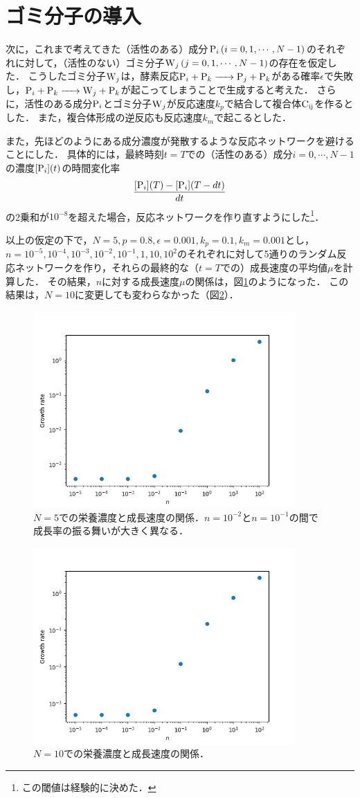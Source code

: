 \documentclass[a4paper,11pt]{jsarticle}
\begin{document}
\section{ゴミ分子の導入}
次に，これまで考えてきた（活性のある）成分$\ce{P_i}\,(i=0,1,\cdots,N-1)$のそれぞれに対して，（活性のない）ゴミ分子$\ce{W_j}\,(j=0,1,\cdots,N-1)$の存在を仮定した．
こうしたゴミ分子$\ce{W_j}$は，酵素反応$\ce{P_i + P_k -> P_j + P_k}$がある確率$\epsilon$で失敗し，$\ce{P_i + P_k -> W_j + P_k}$が起こってしまうことで生成すると考えた．
さらに，活性のある成分$\ce{P_i}$とゴミ分子$\ce{W_j}$が反応速度$k_p$で結合して複合体$\ce{C_{ij}}$を作るとした．
また，複合体形成の逆反応も反応速度$k_m$で起こるとした．

また，先ほどのようにある成分濃度が発散するような反応ネットワークを避けることにした．
具体的には，最終時刻$t=T$での（活性のある）成分$i=0,\cdots,N-1$の濃度$[\ce{P_i}](t)$の時間変化率
\begin{equation}
  \frac{[\ce{P_i}](T)-[\ce{P_i}](T-dt)}{dt}
\end{equation}
の2乗和が$10^{-8}$を超えた場合，反応ネットワークを作り直すようにした\footnote{この閾値は経験的に決めた．}．

以上の仮定の下で，$N=5,p=0.8,\epsilon=0.001,k_p=0.1,k_m=0.001$とし，$n=10^{-5},10^{-4},10^{-3},10^{-2},10^{-1},1,10,10^2$のそれぞれに対して5通りのランダム反応ネットワークを作り，それらの最終的な（$t=T$での）成長速度の平均値$\mu$を計算した．
その結果，$n$に対する成長速度$\mu$の関係は，図\ref{fig:waste_10n}のようになった．
この結果は，$N=10$に変更しても変わらなかった（図\ref{fig:waste_N10_p08}）．

\begin{figure}[htbp]
  \centering
  \includegraphics[width=10cm]{waste_10n.png}
  \caption{$N=5$での栄養濃度と成長速度の関係．$n=10^{-2}$と$n=10^{-1}$の間で成長率の振る舞いが大きく異なる．}
  \label{fig:waste_10n}
\end{figure}

\begin{figure}[htbp]
  \centering
  \includegraphics[width=10cm]{waste_N10_p08.png}
  \caption{$N=10$での栄養濃度と成長速度の関係．}
  \label{fig:waste_N10_p08}
\end{figure}
\end{document}
